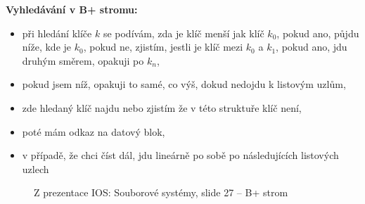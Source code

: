 \documentclass[a4paper, 11pt]{article}
\begin{document}
\textbf{Vyhledávání v B+ stromu:}
\begin{itemize}
    \item při hledání klíče $k$ se podívám, zda je klíč menší jak klíč $k_0$, pokud ano, půjdu níže, kde je $k_0$, pokud ne, zjistím, jestli je klíč mezi $k_0$ a $k_1$, pokud ano, jdu druhým směrem, opakuji po $k_n$,
    \item pokud jsem níž, opakuji to samé, co výš, dokud nedojdu k listovým uzlům,
    \item zde hledaný klíč najdu nebo zjistím že v této struktuře klíč není,
    \item poté mám odkaz na datový blok,
    \item v případě, že chci číst dál, jdu lineárně po sobě po následujících listových uzlech
\end{itemize}

\begin{figure}[htb]
    \centering
    \caption{Z prezentace IOS: Souborové systémy, slide 27 -- B+ strom}
\end{figure}

\newpage
\end{document}

